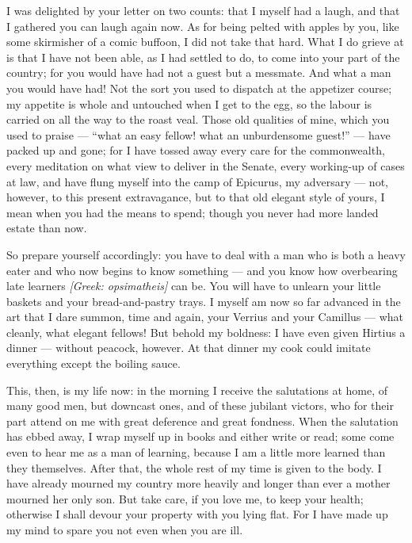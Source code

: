

 I was delighted by your letter on two counts: that I myself had a laugh, and that I gathered you can laugh again now. As for being pelted with apples by you, like some skirmisher of a comic buffoon, I did not take that hard. What I do grieve at is that I have not been able, as I had settled to do, to come into your part of the country; for you would have had not a guest but a messmate. And what a man you would have had! Not the sort you used to dispatch at the appetizer course; my appetite is whole and untouched when I get to the egg, so the labour is carried on all the way to the roast veal. Those old qualities of mine, which you used to praise --- ``what an easy fellow! what an unburdensome guest!'' --- have packed up and gone; for I have tossed away every care for the commonwealth, every meditation on what view to deliver in the Senate, every working-up of cases at law, and have flung myself into the camp of Epicurus, my adversary --- not, however, to this present extravagance, but to that old elegant style of yours, I mean when you had the means to spend; though you never had more landed estate than now.

 So prepare yourself accordingly: you have to deal with a man who is both a heavy eater and who now begins to know something --- and you know how overbearing late learners \textit{[Greek: opsimatheis]} can be. You will have to unlearn your little baskets and your bread-and-pastry trays. I myself am now so far advanced in the art that I dare summon, time and again, your Verrius and your Camillus --- what cleanly, what elegant fellows! But behold my boldness: I have even given Hirtius a dinner --- without peacock, however. At that dinner my cook could imitate everything except the boiling sauce.

 This, then, is my life now: in the morning I receive the salutations at home, of many good men, but downcast ones, and of these jubilant victors, who for their part attend on me with great deference and great fondness. When the salutation has ebbed away, I wrap myself up in books and either write or read; some come even to hear me as a man of learning, because I am a little more learned than they themselves. After that, the whole rest of my time is given to the body. I have already mourned my country more heavily and longer than ever a mother mourned her only son. But take care, if you love me, to keep your health; otherwise I shall devour your property with you lying flat. For I have made up my mind to spare you not even when you are ill.
